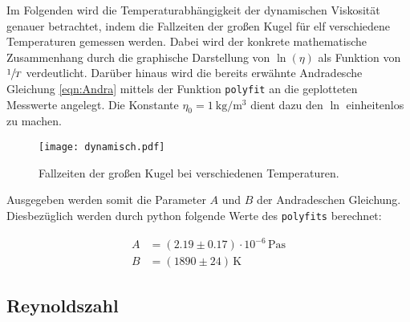 Im Folgenden wird die Temperaturabhängigkeit der dynamischen Viskosität genauer betrachtet, indem die Fallzeiten 
der großen Kugel für elf verschiedene Temperaturen gemessen werden. Dabei wird der konkrete mathematische Zusammenhang 
durch die graphische Darstellung von $\ln(\eta)$ als Funktion von $\sfrac{1}{T}$ verdeutlicht. Darüber hinaus wird die 
bereits erwähnte Andradesche Gleichung \eqref{eqn:Andra} mittels der Funktion \texttt{polyfit} an die geplotteten Messwerte 
angelegt. Die Konstante $\eta_0 = \qty{1}{\kilo \gram \per \cubic \meter}$ dient dazu den $\ln{}$ einheitenlos zu machen.

\begin{figure}[H]
    \centering
    \texttt{[image: dynamisch.pdf]}
    \caption{Fallzeiten der großen Kugel bei verschiedenen Temperaturen.}
\end{figure}

\noindent Ausgegeben werden somit die Parameter $A$ und $B$ der Andradeschen Gleichung. Diesbezüglich werden durch 
python folgende Werte des \texttt{polyfits} berechnet:

\begin{align*}
    A &= \left(2.19 \pm 0.17\right) \cdot 10^{-6}\,\unit{\pascal\second}\\
    B &= \left(1890 \pm 24\right)\,\unit{\kelvin}
\end{align*}

\subsection{Reynoldszahl}

